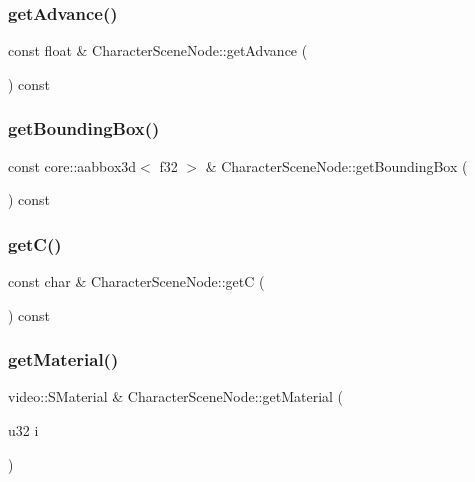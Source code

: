 \subsubsection{\texorpdfstring{getAdvance()}{getAdvance()}}
{\footnotesize\ttfamily const float \& Character\+Scene\+Node\+::get\+Advance (\begin{DoxyParamCaption}{ }\end{DoxyParamCaption}) const}

\mbox{\label{class_character_scene_node_a9657f9d15c4f7aaa955ab5f643e83c73}} 
\subsubsection{\texorpdfstring{getBoundingBox()}{getBoundingBox()}}
{\footnotesize\ttfamily const core\+::aabbox3d$<$ f32 $>$ \& Character\+Scene\+Node\+::get\+Bounding\+Box (\begin{DoxyParamCaption}{ }\end{DoxyParamCaption}) const}

\mbox{\label{class_character_scene_node_a3818125c2e3a732b5fea446c10d9ab4d}} 
\subsubsection{\texorpdfstring{getC()}{getC()}}
{\footnotesize\ttfamily const char \& Character\+Scene\+Node\+::getC (\begin{DoxyParamCaption}{ }\end{DoxyParamCaption}) const}

\mbox{\label{class_character_scene_node_a148697cb4f3b380425611950d0a78496}} 
\subsubsection{\texorpdfstring{getMaterial()}{getMaterial()}}
{\footnotesize\ttfamily video\+::\+S\+Material \& Character\+Scene\+Node\+::get\+Material (\begin{DoxyParamCaption}\item[{u32}]{i }\end{DoxyParamCaption})}

